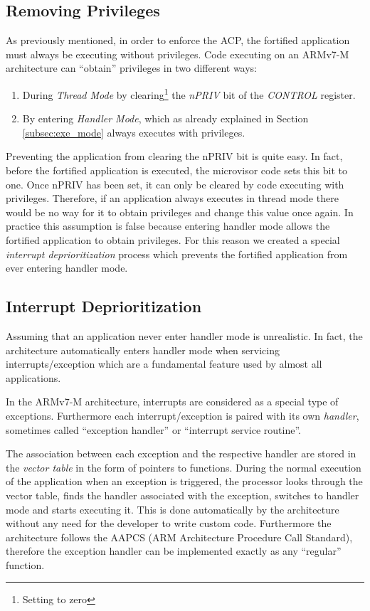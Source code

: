 \documentclass{article}
\begin{document}
\subsection{Removing Privileges}
As previously mentioned, in order to enforce the ACP, the fortified application must always be executing without privileges. Code executing on an ARMv7-M architecture can ``obtain'' privileges in two different ways:
\begin{enumerate}
	\item During \textit{Thread Mode} by clearing\footnote{Setting to zero} the \textit{nPRIV} bit of the \textit{CONTROL} register.
	\item By entering \textit{Handler Mode}, which as already explained in Section \ref{subsec:exe_mode} always executes with privileges.
\end{enumerate}

Preventing the application from clearing the nPRIV bit is quite easy. In fact, before the fortified application is executed, the microvisor code sets this bit to one. Once nPRIV has been set, it can only be cleared by code executing with privileges. Therefore, if an application always executes in thread mode there would be no way for it to obtain privileges and change this value once again. In practice this assumption is false because entering handler mode allows the fortified application to obtain privileges. For this reason we created a special \textit{interrupt deprioritization} process which prevents the fortified application from ever entering handler mode.

\subsection{Interrupt Deprioritization}
\label{subsec:deprio}
Assuming that an application never enter handler mode is unrealistic. In fact, the architecture automatically enters handler mode when servicing interrupts/exception which are a fundamental feature used by almost all applications.

In the ARMv7-M architecture, interrupts are considered as a special type of exceptions. Furthermore each interrupt/exception is paired with its own \textit{handler}, sometimes called ``exception handler'' or ``interrupt service routine''.

The association between each exception and the respective handler are stored in the \textit{vector table} in the form of pointers to functions. During the normal execution of the application when an exception is triggered, the processor looks through the vector table, finds the handler associated with the exception, switches to handler mode and starts executing it. This is done automatically by the architecture without any need for the developer to write custom code. Furthermore the architecture follows the AAPCS (ARM Architecture Procedure Call Standard), therefore the exception handler can be implemented exactly as any ``regular'' function.
\end{document}
